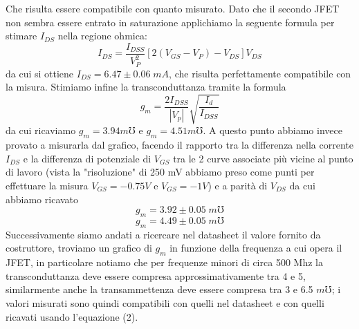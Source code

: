 \documentclass[10pt, a4paper, italian]{article}
\begin{document}
Che risulta essere compatibile con quanto misurato.
Dato che il secondo JFET non sembra essere entrato in saturazione applichiamo la seguente formula per stimare $I_{DS}$ nella regione ohmica:
\begin{equation}
I_{DS}=\frac{I_{DSS}}{V_P^2}[2(V_{GS}-V_P) - V_{DS}]V_{DS}
\end{equation}
da cui si ottiene $I_{DS}= 6.47 \pm 0.06 \; mA$, che risulta perfettamente compatibile con la misura.
Stimiamo infine la transconduttanza tramite la formula
\begin{equation}
g_m = \frac{2 I_{DSS}}{|V_p|}\sqrt{\frac{I_{d}}{I_{DSS}}}
\end{equation}
da cui ricaviamo $g_m = 3.94 \si{m\mho}$ e $g_m = 4.51 \si{m\mho}$.
A questo punto abbiamo invece provato a misurarla dal grafico, facendo il rapporto tra la differenza nella corrente $I_{DS} $ e la differenza di potenziale di $V_{GS}$ tra le 2 curve associate più vicine al punto di lavoro (vista la "risoluzione" di 250 mV abbiamo preso come punti per effettuare la misura $V_{GS}=-0.75 V$ e $V_{GS}= -1 V$) e a parità di $V_{DS}$ da cui abbiamo ricavato
\[
g_m=3.92\pm 0.05 \; \si{m\mho}
\]
\[
g_m=4.49\pm 0.05 \; \si{m\mho}
\]
Successivamente siamo andati a ricercare nel datasheet il valore fornito da costruttore, troviamo un grafico di $g_m$ in funzione della frequenza a cui opera il JFET, in particolare notiamo che per frequenze minori di circa 500 Mhz la transconduttanza deve essere compresa approssimativamente tra 4 e 5, similarmente anche la transammettenza deve essere compresa tra 3 e 6.5 $\si{m\mho}$; i valori misurati sono quindi compatibili con quelli nel datasheet e con quelli ricavati usando l'equazione (2).
\end{document}
